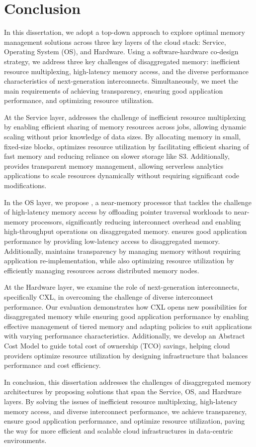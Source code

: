 \chapter{Conclusion}
\label{chap:conclusion}

In this dissertation, we adopt a top-down approach to explore optimal memory management solutions across three key layers of the cloud stack: Service, Operating System (OS), and Hardware. Using a software-hardware co-design strategy, we address three key challenges of disaggregated memory: inefficient resource multiplexing, high-latency memory access, and the diverse performance characteristics of next-generation interconnects. Simultaneously, we meet the main requirements of achieving transparency, ensuring good application performance, and optimizing resource utilization.

At the Service layer, \jiffy addresses the challenge of inefficient resource multiplexing by enabling efficient sharing of memory resources across jobs, allowing dynamic scaling without prior knowledge of data sizes. By allocating memory in small, fixed-size blocks, \jiffy optimizes resource utilization by facilitating efficient sharing of fast memory and reducing reliance on slower storage like S3. Additionally, \jiffy provides transparent memory management, allowing serverless analytics applications to scale resources dynamically without requiring significant code modifications.

In the OS layer, we propose \pulse, a near-memory processor that tackles the challenge of high-latency memory access by offloading pointer traversal workloads to near-memory processors, significantly reducing interconnect overhead and enabling high-throughput operations on disaggregated memory. \pulse ensures good application performance by providing low-latency access to disaggregated memory. Additionally, \pulse maintains transparency by managing memory without requiring application re-implementation, while also optimizing resource utilization by efficiently managing resources across distributed memory nodes.


At the Hardware layer, we examine the role of next-generation interconnects, specifically CXL, in overcoming the challenge of diverse interconnect performance. Our evaluation demonstrates how CXL opens new possibilities for disaggregated memory while ensuring good application performance by enabling effective management of tiered memory and adapting policies to suit applications with varying performance characteristics. Additionally, we develop an Abstract Cost Model to guide total cost of ownership (TCO) savings, helping cloud providers optimize resource utilization by designing infrastructure that balances performance and cost efficiency.

In conclusion, this dissertation addresses the challenges of disaggregated memory architectures by proposing solutions that span the Service, OS, and Hardware layers. By solving the issues of inefficient resource multiplexing, high-latency memory access, and diverse interconnect performance, we achieve transparency, ensure good application performance, and optimize resource utilization, paving the way for more efficient and scalable cloud infrastructures in data-centric environments.

